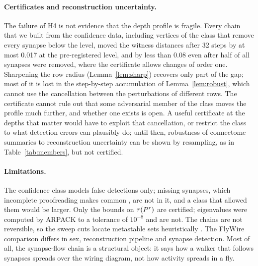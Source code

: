 \paragraph{Certificates and reconstruction uncertainty.}
The failure of H4 is not evidence that the depth profile is fragile. Every chain that we built
from the confidence data, including vertices of the class that remove every synapse below the level,
moved the witness distances after 32 steps by at most 0.017 at the pre-registered level, and by less
than 0.08 even after half of all synapses were removed, where the certificate allows changes of
order one. Sharpening the row radius (Lemma~\ref{lem:sharp}) recovers only part
of the gap; most of it is lost in the step-by-step accumulation of Lemma~\ref{lem:robust}, which
cannot use the cancellation between the perturbations of different rows. The certificate cannot rule
out that some adversarial member of the class moves the profile much further, and whether one exists
is open. A useful certificate at the depths that matter would have to exploit that cancellation, or
restrict the class to what detection errors can plausibly do; until then, robustness of connectome
summaries to reconstruction uncertainty can be shown by resampling, as in Table~\ref{tab:members},
but not certified.

\paragraph{Limitations.}
The confidence class models false detections only; missing synapses, which incomplete proofreading
makes common \cite{berg2026}, are not in it, and a class that allowed them would be larger. Only the
bounds on $\tau(P^r)$ are certified; eigenvalues were computed by ARPACK to a tolerance of
$10^{-8}$ and are not. The chains are not reversible, so the sweep cuts locate metastable sets
heuristically \cite{chung2005,deuflhard2005}. The FlyWire comparison differs in sex, reconstruction
pipeline and synapse detection. Most of all, the synapse-flow chain is a structural object: it says
how a walker that follows synapses spreads over the wiring diagram, not how activity spreads in a
fly.
